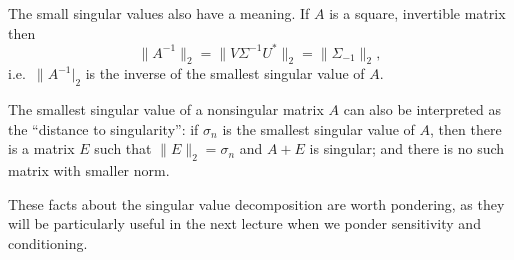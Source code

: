 \documentclass[12pt, leqno]{article} %
\begin{document}
The small singular values also have a meaning.  If $A$ is a square,
invertible matrix then
\[
  \|A^{-1}\|_2 = \|V \Sigma^{-1} U^*\|_2 = \|\Sigma_{-1}\|_2,
\]
i.e.~$\|A^{-1}|_2$ is the inverse of the smallest singular value of $A$.

The smallest singular value of a nonsingular matrix $A$ can also be
interpreted as the ``distance to singularity'': if $\sigma_n$ is the
smallest singular value of $A$, then there is a matrix $E$ such that
$\|E\|_2 = \sigma_n$ and $A+E$ is singular; and there is no such
matrix with smaller norm.

These facts about the singular value decomposition are worth
pondering, as they will be particularly useful in the next lecture
when we ponder sensitivity and conditioning.
\end{document}
